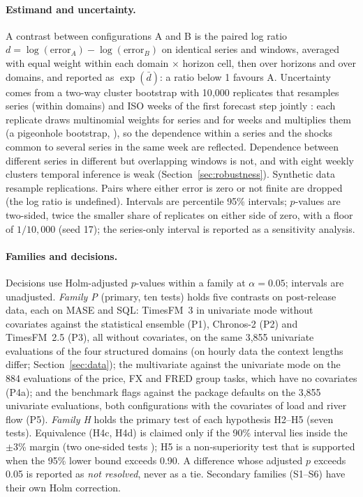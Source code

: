 \paragraph{Estimand and uncertainty.} A contrast between configurations A and B is the paired log ratio
$d = \log(\text{error}_A) - \log(\text{error}_B)$ on identical series and windows, averaged with equal weight within each domain
$\times$ horizon cell, then over horizons and over domains, and reported as $\exp(\bar d)$: a ratio below 1 favours A. Uncertainty
comes from a two-way cluster bootstrap with 10{,}000 replicates that resamples series (within domains) and ISO weeks of the first
forecast step jointly \citep{cameron2011multiway}: each replicate draws multinomial weights for series and for weeks and multiplies them
(a pigeonhole bootstrap, \citealp{owen2007pigeonhole}), so the dependence within a series and the shocks common to several series in the same week are reflected.
Dependence between different series in different but overlapping windows is not, and with eight weekly clusters temporal
inference is weak (Section~\ref{sec:robustness}). Synthetic data resample replications. Pairs where either error is zero or not
finite are dropped (the log ratio is undefined). Intervals are percentile 95\% intervals; $p$-values are two-sided, twice the smaller share of replicates on either side
of zero, with a floor of $1/10{,}000$ (seed 17); the series-only interval is reported as a sensitivity analysis.

\paragraph{Families and decisions.} Decisions use Holm-adjusted $p$-values \citep{holm1979} within a family at
$\alpha = 0.05$; intervals are unadjusted. \emph{Family P} (primary, ten tests) holds five contrasts on
post-release data, each on MASE and SQL: TimesFM~3 in univariate mode without covariates against the statistical ensemble (P1),
Chronos-2 (P2) and TimesFM~2.5 (P3), all without covariates, on the same 3{,}855 univariate evaluations of the four structured
domains (on hourly data the context lengths differ; Section~\ref{sec:data}); the multivariate against the univariate mode on the
884 evaluations of the price, FX and FRED group tasks, which have no covariates (P4a); and the benchmark flags against the package
defaults on the 3{,}855 univariate evaluations, both configurations with the covariates of load and river flow (P5). \emph{Family H} holds the primary test of each hypothesis H2--H5
(seven tests). Equivalence (H4c, H4d) is claimed only if the 90\% interval lies inside the $\pm$3\% margin (two one-sided tests
\citep{schuirmann1987tost}); H5 is a non-superiority test that is supported when the 95\% lower bound exceeds 0.90. A
difference whose adjusted $p$ exceeds 0.05 is reported as \emph{not resolved}, never as a tie. Secondary families (S1--S6) have their
own Holm correction.
